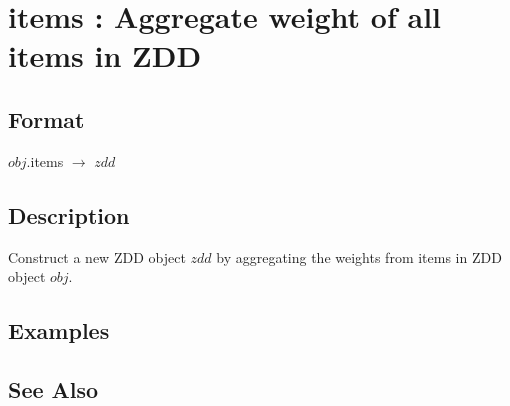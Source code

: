 
\section{items : Aggregate weight of all items in ZDD\label{sect:items }}
\subsection*{Format}
$obj$.items $\rightarrow$ $zdd$

\subsection*{Description}
Construct a new ZDD object $zdd$ by aggregating the weights from items in ZDD object $obj$. 

\subsection*{Examples}


\subsection*{See Also} 

